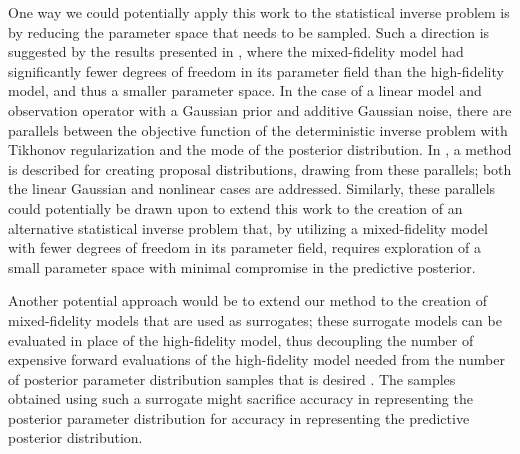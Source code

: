 One way we could potentially apply this work to the statistical inverse problem is by reducing the parameter space that needs to be sampled. Such a direction is suggested by the results presented in , where the mixed-fidelity model had significantly fewer degrees of freedom in its parameter field than the high-fidelity model, and thus a smaller parameter space. In the case of a linear model and observation operator with a Gaussian prior and additive Gaussian noise, there are parallels between the objective function of the deterministic inverse problem with Tikhonov regularization and the mode of the posterior distribution. In \cite{Martetal12}, a method is described for creating proposal distributions, drawing from these parallels; both the linear Gaussian and nonlinear cases are addressed. Similarly, these parallels could potentially be drawn upon to extend this work to the creation of an alternative statistical inverse problem that, by utilizing a mixed-fidelity model with fewer degrees of freedom in its parameter field, requires exploration of a small parameter space with minimal compromise in the predictive posterior.

Another potential approach would be to extend our method to the creation of mixed-fidelity models that are used as surrogates; these surrogate models can be evaluated in place of the high-fidelity model, thus decoupling the number of expensive forward evaluations of the high-fidelity model needed from the number of posterior parameter distribution samples that is desired \cite{Con14}. The samples obtained using such a surrogate might sacrifice accuracy in representing the posterior parameter distribution for accuracy in representing the predictive posterior distribution. 


